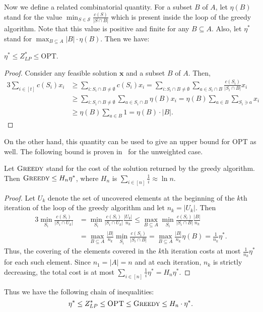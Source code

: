 \documentclass[submission]{llncs}
\def\bs#1{{\boldsymbol{#1}}}
\begin{document}
  Now we define a related combinatorial quantity.
  For a subset $B$ of $A$, let $\eta(B)$ stand for the value $\mathop{\min}_{S\in\mathcal{S}}\frac{c(S)}{|S\cap B|}$ which is
  present inside the loop of the greedy algorithm. Note that this value is positive and finite for any $B\subseteq A$.
  Also, let $\eta^*$ stand for $\mathop{\max}_{B\subseteq A}|B|\cdot \eta(B)$. Then we have:
  \begin{proposition}
  \label{prop-rhostar-opt}
  $\eta^*\leq Z^*_{LP}\leq\mathrm{OPT}$.
  \end{proposition}
  \begin{proof}
  Consider any feasible solution $\bs{x}$ and a subset $B$ of $A$.
  Then,
  \begin{alignat*}{3}
\sum_{i\in [t]}c(S_i)x_i
  &\geq \sum_{i:S_i\cap B\neq \emptyset}c(S_i)x_i
  = \sum_{i:S_i\cap B\neq\emptyset}\sum_{a\in S_i\cap B}\tfrac{c(S_i)}{|S_i\cap B|}x_i\\
  &\geq \sum_{i:S_i\cap B\neq\emptyset}\sum_{a\in S_i\cap B}\eta(B)x_i
  = \eta(B)\sum_{a\in B}\sum_{S_i\ni a}x_i\\
  &\geq \eta(B)\sum_{a\in B}1
  = \eta(B)\cdot|B|.
  \end{alignat*}
  \end{proof}


  On the other hand, this quantity can be used to give an upper bound for OPT as well.
  The following bound is proven in~\cite{LovaszThesis} for the unweighted case.
\begin{proposition}
  \label{prop-greedy}
  Let $\textsc{Greedy}$ stand for the cost of the solution returned by the greedy algorithm. Then $\textsc{Greedy}\leq H_n\eta^*$,
where $H_n$ is $\sum_{i\in[n]}\frac{1}{i}\approx \ln n$.
  \end{proposition}
  \begin{proof}
  Let $U_k$ denote the set of uncovered elements at the beginning of the $k$th iteration of the loop of the greedy algorithm
  and let $n_k=|U_k|$.
  Then
  \begin{alignat*}{3}
  \min_{S_i}\tfrac{c(S_i)}{|S_i\cap U_k|}
  &=\min_{S_i}\tfrac{c(S_i)}{|S_i\cap U_k|}\tfrac{|U_k|}{n_k}
  \leq \max_{B\subseteq A}\min_{S_i}\tfrac{c(S_i)}{|S_i\cap B|}\tfrac{|B|}{n_k}\\
  &= \max_{B\subseteq A}\tfrac{|B|}{n_k}\min_{S_i}\tfrac{c(S_i)}{|S_i\cap B|}
  = \max_{B\subseteq A}\tfrac{|B|}{n_k}\eta(B)
  = \tfrac{1}{n_k}\eta^*.
  \end{alignat*}
  Thus, the covering of the elements covered in the $k$th iteration costs at most $\frac{1}{n_k}\eta^*$ for each such element.
  Since $n_1=|A|=n$ and at each iteration, $n_k$ is strictly decreasing,
  the total cost is at most $\sum_{i\in[n]}\frac{1}{i}\eta^*=H_n\eta^*$.
  \end{proof}
Thus we have the following chain of inequalities:
  \[ \eta^*\le Z^*_{LP}\le\textsc{OPT}\leq\textsc{Greedy}\le H_n\cdot \eta^*. \]
\end{document}
